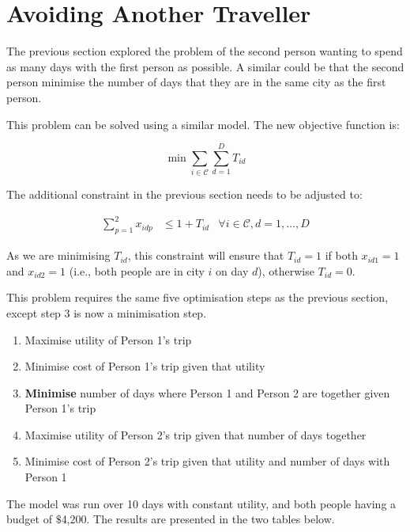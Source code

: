 \documentclass[12pt]{article}
\begin{document}
\section{Avoiding Another Traveller}

The previous section explored the problem of the second person wanting to spend as many days with the first person as possible. A similar could be that the second person minimise the number of days that they are in the same city as the first person.

This problem can be solved using a similar model. The new objective function is:

\begin{equation*}
	\min \sum_{i \in \mathcal{C}} \sum_{d = 1}^{D} T_{id}
\end{equation*}

The additional constraint in the previous section needs to be adjusted to:

\begin{align}
	\sum_{p = 1}^{2} x_{idp} & \leq 1 + T_{id} & \forall i \in \mathcal{C}, d = 1, \ldots, D
\end{align}

As we are minimising $T_{id}$, this constraint will ensure that $T_{id} = 1$ if both $x_{id1} = 1$ and $x_{id2} = 1$ (i.e., both people are in city $i$ on day $d$), otherwise $T_{id} = 0$.

This problem requires the same five optimisation steps as the previous section, except step 3 is now a minimisation step.

\begin{enumerate}
	\item Maximise utility of Person 1's trip
	\item Minimise cost of Person 1's trip given that utility
	\item \textbf{Minimise} number of days where Person 1 and Person 2 are together given Person 1's trip
	\item Maximise utility of Person 2's trip given that number of days together
	\item Minimise cost of Person 2's trip given that utility and number of days with Person 1
\end{enumerate}

The model was run over 10 days with constant utility, and both people having a budget of $\$$4,200. The results are presented in the two tables below.
\end{document}
